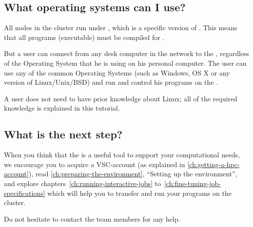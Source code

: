 \subsection{What operating systems can I use?}
\label{sec:what-operating-systems-can-i-use}

All nodes in the \hpc cluster run under \operatingsystemSL, which is a specific version of \operatingsystemRHEL. This means that
all programs (executable) must be compiled for \operatingsystemSL.

But a user can connect from any desk computer in the \university network to the \hpc,
regardless of the Operating System that he is using on his personal computer.
The user can use any of the common Operating Systems (such as Windows, OS X or
any version of Linux/Unix/BSD) and run and control his programs on the \hpc.

A user does not need to have prior knowledge about Linux; all of the required
knowledge is explained in this tutorial.

\subsection{What is the next step?}
\label{sec:what-is-the-next-step}

When you think that the \hpc is a useful tool to support your computational
needs, we encourage you to acquire a VSC-account (as explained in
\autoref{ch:getting-a-hpc-account}), read \autoref{ch:preparing-the-environment}, ``Setting up the
environment'', and explore chapters~\ref{ch:running-interactive-jobs} to~\ref{ch:fine-tuning-job-specifications} which will help you to transfer and
run your programs on the \hpc cluster.

Do not hesitate to contact the \hpc team members for any help.
